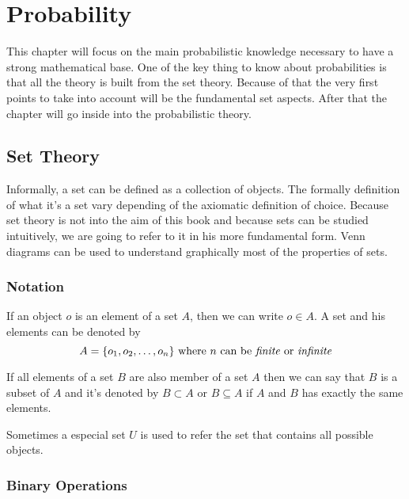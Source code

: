 \chapter{Probability} %
\label{cha:probability}

This chapter will focus on the main probabilistic knowledge necessary to have a
strong mathematical base. One of the key thing to know about probabilities is
that all the theory is built from the set theory. Because of that the very
first points to take into account will be the fundamental set aspects. After
that the chapter will go inside into the probabilistic theory.

\section{Set Theory} %
\label{sec:set_theory}

Informally, a set can be defined as a collection of objects. The formally
definition of what it's a set vary depending of the axiomatic definition of
choice. Because set theory is not into the aim of this book and because sets can
be studied intuitively, we are going to refer to it in his more fundamental
form. Venn diagrams can be used to understand graphically most of the properties
of sets.

\subsection{Notation}
If an object $o$ is an element of a set $A$, then we can write $o \in A$. A set
and his elements can be denoted by
\begin{equation*}
    A = \{o_1, o_2, \dots , o_n\} \text{ where $n$ can be \emph{finite} or
    \emph{infinite}}
\end{equation*}

If all elements of a set $B$ are also member of a set $A$ then we can say that
$B$ is a subset of $A$ and it's denoted by $B \subset A$ or $B \subseteq A$ if
$A$ and $B$ has exactly the same elements.

Sometimes a especial set $U$ is used to refer the set that contains all possible
objects.

\subsection{Binary Operations}

